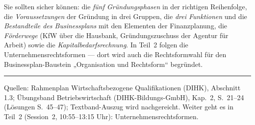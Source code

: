 \documentclass[11pt, a4paper]{article}
\begin{document}
\begin{merksatz}[title={\bfseries Wichtig für die Prüfungsvorbereitung (Teil 1)}]
Sie sollten sicher können: die \emph{fünf Gründungsphasen} in der richtigen Reihenfolge,
die \emph{Voraussetzungen} der Gründung in drei Gruppen, die \emph{drei Funktionen} und
die \emph{Bestandteile des Businessplans} mit den Elementen der Finanzplanung, die
\emph{Förderwege} (KfW über die Hausbank, Gründungszuschuss der Agentur für Arbeit)
sowie die \emph{Kapitalbedarfsrechnung}. In Teil~2 folgen die Unternehmensrechtsformen
--- dort wird auch die Rechtsformwahl für den Businessplan-Baustein „Organisation und
Rechtsform`` begründet.
\end{merksatz}

\vspace{1em}
\hrule
\vspace{0.8em}
\noindent\textsf{\small Quellen: Rahmenplan Wirtschaftsbezogene Qualifikationen (DIHK), Abschnitt 1.3;
Übungsband Betriebswirtschaft (DIHK-Bildungs-GmbH), Kap.~2, S.~21--24 (Lösungen S.~45--47);
Textband-Auszug wird nachgereicht. Weiter geht es in Teil~2 (Session~2, 10:55--13:15 Uhr):
Unternehmensrechtsformen.}
\end{document}
